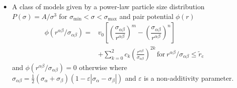 \begin{frame}
\begin{columns}
\begin{column}{0.35\textwidth}
{}
\end{column}

\begin{column}{0.65\textwidth}
{
\begin{itemize}
    \item<1-> A class of models given by a power-law particle size distribution $P(\sigma) = A/\sigma^3$ for $\sigma_\mathrm{min} < \sigma < \sigma_\mathrm{max}$ and  pair potential $\phi(r)$ 
    {
    \begin{align*}
        \phi(r^{\alpha \beta}/\sigma_{\alpha \beta}) =&  v_0\left[\left(\dfrac{\sigma_{\alpha \beta}}{r^{\alpha \beta}}\right)^m-\left(\dfrac{\sigma_{\alpha \beta}}{r^{\alpha \beta}}\right)^n\right] \nonumber
        \\
        & +\sum_{k=0}^{2} c_k \left(\frac{r^{\alpha \beta}}{\sigma_{\alpha \beta}}\right)^{2k} \, \text{for} \  r^{\alpha \beta}/\sigma_{\alpha \beta} \leq \tilde{r}_\mathrm{c}
        \end{align*}
        and $\phi(r^{\alpha \beta}/\sigma_{\alpha \beta})=0$ otherwise where $\sigma_{\alpha \beta}= \frac{1}{2}(\sigma_\alpha+\sigma_\beta)(1-\varepsilon|\sigma_\alpha-\sigma_\beta|)$ and $\varepsilon$ is a non-additivity parameter. 
    }
\end{itemize}
}
\end{column}

\end{columns}


\end{frame}

